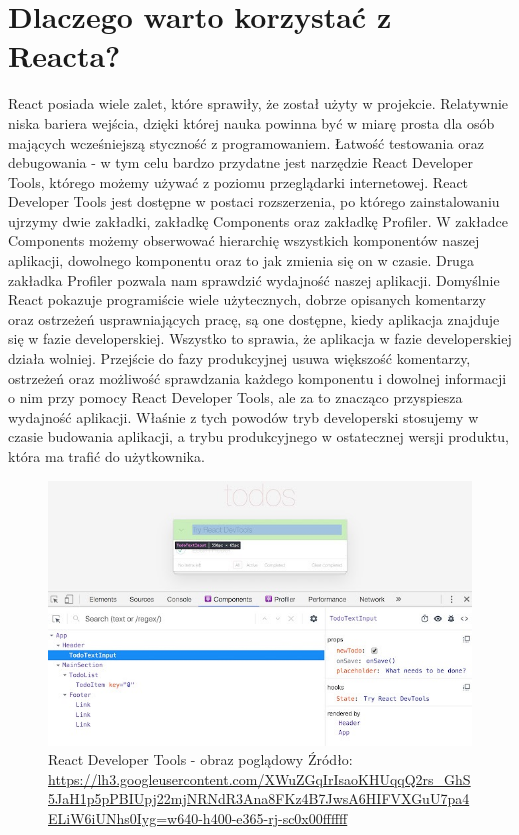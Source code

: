 \documentclass[oneside,polski,logo,indent]{amuthesis}
\begin{document}
\section{Dlaczego warto korzystać z Reacta?}{
React posiada wiele zalet, które sprawiły, że został użyty w projekcie. Relatywnie niska bariera wejścia, dzięki której nauka powinna być w miarę prosta dla osób mających wcześniejszą styczność z programowaniem. Łatwość testowania oraz debugowania - w tym celu bardzo przydatne jest narzędzie React Developer Tools, którego możemy używać z poziomu przeglądarki internetowej. React Developer Tools jest dostępne w postaci rozszerzenia, po którego zainstalowaniu ujrzymy dwie zakładki, zakładkę Components oraz zakładkę Profiler. W zakładce Components możemy obserwować hierarchię wszystkich komponentów naszej aplikacji, dowolnego komponentu oraz to jak zmienia się on w czasie. Druga zakładka Profiler pozwala nam sprawdzić wydajność naszej aplikacji. Domyślnie React pokazuje programiście wiele użytecznych, dobrze opisanych komentarzy oraz ostrzeżeń usprawniających pracę, są one dostępne, kiedy aplikacja znajduje się w fazie developerskiej. Wszystko to sprawia, że aplikacja w fazie developerskiej działa wolniej. Przejście do fazy produkcyjnej usuwa większość komentarzy, ostrzeżeń oraz możliwość sprawdzania każdego komponentu i dowolnej informacji o nim przy pomocy React Developer Tools, ale za to znacząco przyspiesza wydajność aplikacji.
Właśnie z tych powodów tryb developerski stosujemy w czasie budowania aplikacji, a trybu produkcyjnego w ostatecznej wersji produktu, która ma trafić do użytkownika.




\begin{figure}[H]
\centering
\includegraphics[width=13cm]{react dev example.jpg}
\caption{React Developer Tools - obraz poglądowy
\newline
Źródło: \url{https://lh3.googleusercontent.com/XWuZGqIrIsaoKHUqqQ2rs_GhS5JaH1p5pPBIUpj22mjNRNdR3Ana8FKz4B7JwsA6HIFVXGuU7pa4ELiW6iUNhs0Iyg=w640-h400-e365-rj-sc0x00ffffff}
}
\label{react dev example.jpg}
\end{figure}

}
\end{document}
